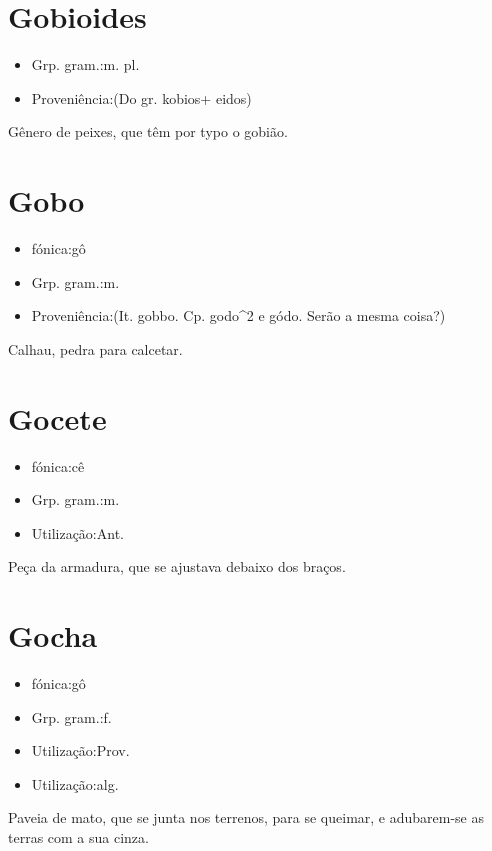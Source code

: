\section{Gobioides}
\begin{itemize}
\item {Grp. gram.:m. pl.}
\end{itemize}
\begin{itemize}
\item {Proveniência:(Do gr. \textunderscore kobios\textunderscore  + \textunderscore eidos\textunderscore )}
\end{itemize}
Gênero de peixes, que têm por typo o gobião.
\section{Gobo}
\begin{itemize}
\item {fónica:gô}
\end{itemize}
\begin{itemize}
\item {Grp. gram.:m.}
\end{itemize}
\begin{itemize}
\item {Proveniência:(It. \textunderscore gobbo\textunderscore . Cp. \textunderscore godo\textunderscore ^2 e \textunderscore gódo\textunderscore . Serão a mesma coisa?)}
\end{itemize}
Calhau, pedra para calcetar.
\section{Gocete}
\begin{itemize}
\item {fónica:cê}
\end{itemize}
\begin{itemize}
\item {Grp. gram.:m.}
\end{itemize}
\begin{itemize}
\item {Utilização:Ant.}
\end{itemize}
Peça da armadura, que se ajustava debaixo dos braços.
\section{Gocha}
\begin{itemize}
\item {fónica:gô}
\end{itemize}
\begin{itemize}
\item {Grp. gram.:f.}
\end{itemize}
\begin{itemize}
\item {Utilização:Prov.}
\end{itemize}
\begin{itemize}
\item {Utilização:alg.}
\end{itemize}
Paveia de mato, que se junta nos terrenos, para se queimar, e adubarem-se as terras com a sua cinza.
